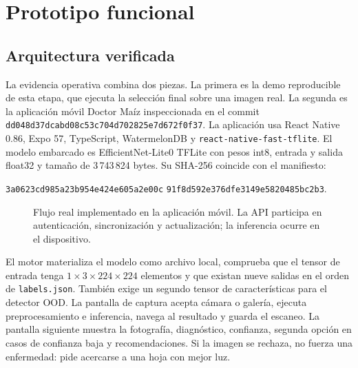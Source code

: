 \section{Prototipo funcional}

\subsection{Arquitectura verificada}

La evidencia operativa combina dos piezas. La primera es la demo reproducible
de esta etapa, que ejecuta la selección final sobre una imagen real. La segunda
es la aplicación móvil Doctor Maíz inspeccionada en el commit
\nolinkurl{dd048d37dcabd08c53c704d702825e7d672f0f37}. La aplicación usa React
Native 0.86, Expo 57, TypeScript, WatermelonDB y
\texttt{react-native-fast-tflite}. El modelo embarcado es
EfficientNet-Lite0 TFLite con pesos int8, entrada y salida float32 y tamaño de
3\,743\,824 bytes. Su SHA-256 coincide con el manifiesto:
\par\smallskip\noindent
\texttt{3a0623cd985a23b954e424e605a2e00c}\allowbreak
\texttt{91f8d592e376dfe3149e5820485bc2b3}.

\begin{figure}[H]
  \centering
  \caption{Flujo real implementado en la aplicación móvil. La API participa en
  autenticación, sincronización y actualización; la inferencia ocurre en el
  dispositivo.}
  \label{fig:prototype-flow}
\end{figure}

El motor materializa el modelo como archivo local, comprueba que el tensor de
entrada tenga $1\times3\times224\times224$ elementos y que existan nueve
salidas en el orden de \texttt{labels.json}. También exige un segundo tensor de
características para el detector OOD. La pantalla de captura acepta cámara o
galería, ejecuta preprocesamiento e inferencia, navega al resultado y guarda el
escaneo. La pantalla siguiente muestra la fotografía, diagnóstico, confianza,
segunda opción en casos de confianza baja y recomendaciones. Si la imagen se
rechaza, no fuerza una enfermedad: pide acercarse a una hoja con mejor luz.

